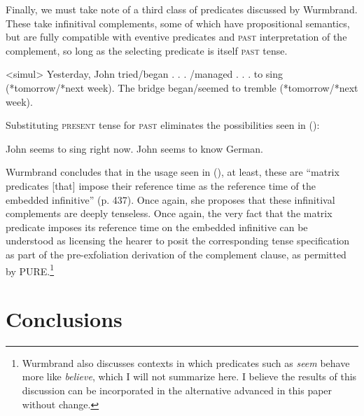 \documentclass[output=paper]{langscibook}
\begin{document}
Finally, we must take note of a third class of predicates discussed by Wurmbrand. These take infinitival complements, some of which have propositional semantics, but are fully compatible with eventive predicates and \textsc{past} interpretation of the complement, so long as the selecting predicate is itself \textsc{past} tense.

\pex<simul>
\a Yesterday, John tried/began . . . /managed . . . to sing (*tomorrow/*next week).
\a The bridge began/seemed to tremble (*tomorrow/*next week).
\xe

\noindent Substituting \textsc{present} tense for \textsc{past} eliminates
the possibilities seen in ():

\a \ljudge*John seems to sing right now.
\a John seems to know German.
\xe

Wurmbrand concludes that in the usage seen in (), at least, these are “matrix predicates {[}that{]} impose their reference time as the reference time of the embedded infinitive” (p. 437). Once again, she proposes that these infinitival complements are deeply tenseless. Once again, the very fact that the matrix predicate imposes its reference time on the embedded infinitive can be understood as licensing the hearer to posit the corresponding tense specification as part of the pre-exfoliation derivation of the complement clause, as permitted by PURE.\footnote{Wurmbrand also discusses contexts in which predicates such as \textit{seem} behave more like \textit{believe}, which I will not summarize here. I believe the results of this discussion can be incorporated in the alternative advanced in this paper without change.} 

\section{Conclusions}
\end{document}
